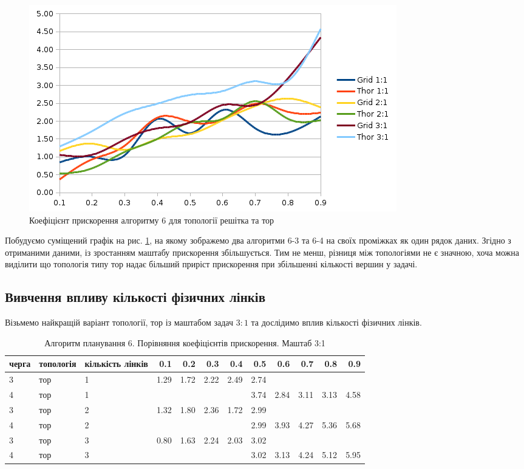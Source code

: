 \begin{figure}[h]
  \begin{center}
    \includegraphics[width=\textwidth]{res/grid_thor_scale.png}
  \end{center}
  \caption{Коефіцієнт прискорення алгоритму 6 для топології решітка та тор}
\label{fig:grid_thor_scale}
\end{figure}

Побудуємо суміщений графік на рис. \ref{fig:grid_thor_scale}, на якому зображемо два алгоритми 6-3 та 6-4 на своїх проміжках як один рядок даних. Згідно з отриманими даними, із зростанням маштабу прискорення збільшується. Тим не менш, різниця між топологіями не є значною, хоча можна виділити що топологія типу тор надає більший приріст прискорення при збільшенні кількості вершин у задачі.

\subsection{Вивчення впливу кількості фізичних лінків}

Візьмемо найкращій варіант топології, тор із маштабом задач $3:1$ та дослідимо вплив кількості фізичних лінків.

\begin{table}[H]
\caption{Алгоритм планування 6. Порівняння коефіцієнтів прискорення. Маштаб 3:1}
\label{tab:big_table}
\centering
\begin{tabular}{lllrrrrrrrrr}
\toprule
черга & топологія & кількість лінків &   0.1 &   0.2 &   0.3 &   0.4 &   0.5 &   0.6 &   0.7 &   0.8 &   0.9 \\
\midrule
3 & тор & 1 & 1.29 & 1.72 & 2.22 & 2.49 & 2.74 &  &  &  &  \\
4 & тор & 1 &  &  &  &  & 3.74 & 2.84 & 3.11 & 3.13 & 4.58 \\

3 & тор & 2 & 1.32 & 1.80 & 2.36 & 1.72 & 2.99 &  &  &  &  \\
4 & тор & 2 &  &  &  &  & 2.99 & 3.93 & 4.27 & 5.36 & 5.68 \\

3 & тор & 3 & 0.80 & 1.63 & 2.24 & 2.03 & 3.02 &  &  &  &  \\
4 & тор & 3 &  &  &  &  & 3.02 & 3.13 & 4.24 & 5.12 & 5.95 \\

\bottomrule
\end{tabular}
\end{table}

